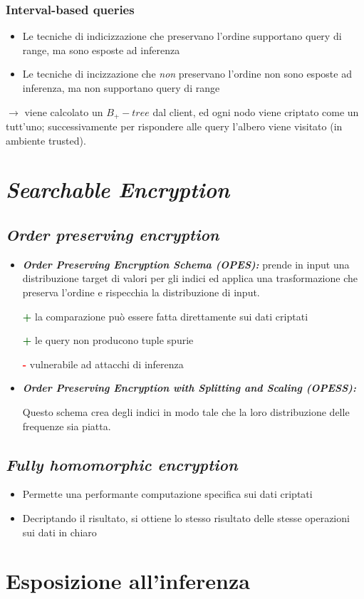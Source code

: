 \documentclass{report}
\begin{document}
\subsubsection{Interval-based queries}
\begin{itemize}
    \item Le tecniche di indicizzazione che preservano l'ordine supportano 
    query di range, ma sono esposte ad inferenza
    \item Le tecniche di incizzazione che \textit{non} preservano l'ordine non sono esposte 
    ad inferenza, ma non supportano query di range
\end{itemize}

$\rightarrow$ viene calcolato un $B_+ -tree$ dal client, ed ogni nodo viene criptato come un tutt'uno; successivamente 
per rispondere alle query l'albero viene visitato (in ambiente trusted).

\newpage
\section{\textit{Searchable Encryption}}
\subsection{\textit{Order preserving encryption}}
\begin{itemize}
    \item \textbf{\textit{Order Preserving Encryption Schema (OPES):}} prende in input una distribuzione target 
    di valori per gli indici ed applica una trasformazione che preserva l'ordine e rispecchia 
    la distribuzione di input.

    \textcolor{darkgreen}{\textbf{+}} la comparazione può essere fatta direttamente sui dati criptati 

    \textcolor{darkgreen}{\textbf{+}} le query non producono tuple spurie 

    \textcolor{red}{\textbf{-}} vulnerabile ad attacchi di inferenza

    \item \textbf{\textit{Order Preserving Encryption with Splitting and Scaling (OPESS):}}
    
    Questo schema crea degli indici in modo tale che la loro distribuzione delle frequenze sia piatta.
\end{itemize}

\subsection{\textit{Fully homomorphic encryption}}

\begin{itemize}
    \item Permette una performante computazione specifica sui dati criptati 
    \item Decriptando il risultato, si ottiene lo stesso risultato delle stesse operazioni sui dati in chiaro
\end{itemize}

\newpage
\section{Esposizione all'inferenza}
\end{document}
